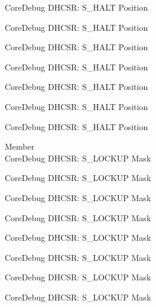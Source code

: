 \begin{DoxyRefList}
\label{deprecated__deprecated000776}%
%
Core\+Debug DHCSR\+: S\+\_\+\+HALT Position 

\label{deprecated__deprecated000830}%
%
Core\+Debug DHCSR\+: S\+\_\+\+HALT Position 

\label{deprecated__deprecated000915}%
%
Core\+Debug DHCSR\+: S\+\_\+\+HALT Position 

\label{deprecated__deprecated000972}%
%
Core\+Debug DHCSR\+: S\+\_\+\+HALT Position 

\label{deprecated__deprecated001048}%
%
Core\+Debug DHCSR\+: S\+\_\+\+HALT Position 

\label{deprecated__deprecated001135}%
%
Core\+Debug DHCSR\+: S\+\_\+\+HALT Position 

\label{deprecated__deprecated001237}%
%
Core\+Debug DHCSR\+: S\+\_\+\+HALT Position  
\item[Member \doxylink{group___c_m_s_i_s___core_debug_ga7b67e4506d7f464ef5dafd6219739756}{Core\+Debug\+\_\+\+DHCSR\+\_\+\+S\+\_\+\+LOCKUP\+\_\+\+Msk} ]\hfill \\
\label{deprecated__deprecated000022}%
%
Core\+Debug DHCSR\+: S\+\_\+\+LOCKUP Mask 

\label{deprecated__deprecated000114}%
%
Core\+Debug DHCSR\+: S\+\_\+\+LOCKUP Mask 

\label{deprecated__deprecated000168}%
%
Core\+Debug DHCSR\+: S\+\_\+\+LOCKUP Mask 

\label{deprecated__deprecated000253}%
%
Core\+Debug DHCSR\+: S\+\_\+\+LOCKUP Mask 

\label{deprecated__deprecated000310}%
%
Core\+Debug DHCSR\+: S\+\_\+\+LOCKUP Mask 

\label{deprecated__deprecated000386}%
%
Core\+Debug DHCSR\+: S\+\_\+\+LOCKUP Mask 

\label{deprecated__deprecated000473}%
%
Core\+Debug DHCSR\+: S\+\_\+\+LOCKUP Mask 

\label{deprecated__deprecated000575}%
%
Core\+Debug DHCSR\+: S\+\_\+\+LOCKUP Mask 


\end{DoxyRefList}

